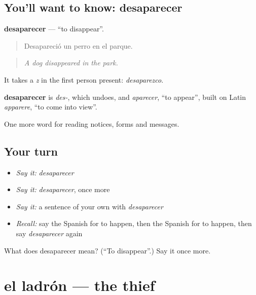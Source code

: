 \subsection*{You'll want to know: desaparecer}
\textbf{desaparecer} — \textquotedblleft{}to disappear\textquotedblright{}.

\begin{quote}
Desapareció un perro en el parque.
\end{quote}

\begin{quote}
\emph{A dog disappeared in the park.}
\end{quote}

It takes a \emph{z} in the first person present: \emph{desaparezco}.

\begin{cousinweb}
\textbf{desaparecer} is \emph{des-}, which undoes, and \emph{aparecer}, \textquotedblleft{}to appear\textquotedblright{}, built on Latin \emph{apparere}, \textquotedblleft{}to come into view\textquotedblright{}.
\end{cousinweb}

\begin{grammarlens}[title={What you've built}]
One more word for reading notices, forms and messages.
\end{grammarlens}

\subsection*{Your turn}
\begin{itemize}
\raggedright
  \item \emph{Say it:} \emph{desaparecer}
  \item \emph{Say it:} \emph{desaparecer}, once more
  \item \emph{Say it:} a sentence of your own with \emph{desaparecer}
  \item \emph{Recall:} say the Spanish for to happen, then the Spanish for to happen, then say \emph{desaparecer} again
\end{itemize}

\begin{tcolorbox}[breakable,colback=teal!4,colframe=teal!35!black,title={Before you move on}]
What does desaparecer mean? (\textquotedblleft{}To disappear\textquotedblright{}.) Say it once more.
\end{tcolorbox}
\section[el ladrón]{el ladrón — the thief}

